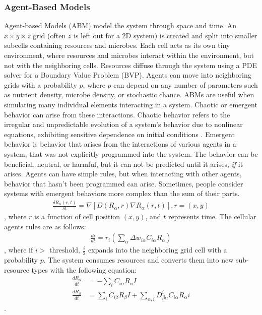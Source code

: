 \subsubsection{Agent-Based Models}
Agent-based Models (ABM) model the system through space and time.
An $x \times y \times z$ grid (often $z$ is left out for a 2D system) is created and split into smaller subcells containing resources and microbes.
Each cell acts as its own tiny environment, where resources and microbes interact within the environment, but not with the neighboring cells.
Resources diffuse through the system using a PDE solver for a Boundary Value Problem (BVP).
Agents can move into neighboring grids with a probability $p$, where $p$ can depend on any number of parameters such as nutrient density, microbe density, or stochastic chance. \newline 
ABMs are useful when simulating many individual elements interacting in a system.
Chaotic or emergent behavior can arise from these interactions.
Chaotic behavior refers to the irregular and unpredictable evolution of a system's behavior due to nonlinear equations, exhibiting sensitive dependence on initial conditions \cite{encyclopedia_of_physical_science_and_technology}. \newline 
Emergent behavior is behavior that arises from the interactions of various agents in a system, that was not explicitly programmed into the system.
The behavior can be beneficial, neutral, or harmful, but it can not be predicted until it arises, \textit{if} it arises.
Agents can have simple rules, but when interacting with other agents, behavior that hasn't been programmed can arise.
Sometimes, people consider systems with emergent behaviors more complex than the sum of their parts. \newline
\begin{align} 
    \frac{\delta R_\alpha(r, t)}{\delta t} = \nabla \left[D \left( R_\alpha, r\right) \nabla R_\alpha \left( r, t \right) \right], r = \left(x, y\right)
\end{align}, where $r$ is a function of cell position $(x, y)$, and $t$ represents time. 
The cellular agents rules are as follows: 
\begin{align} 
    \frac{di}{dt} = r_i \left( \sum_\alpha \Delta w_{i\alpha}C_{i\alpha}R_\alpha\right)
\end{align}, where if $i> \text{ threshold, }\frac{i}{2}$ expands into the neighboring grid cell with a probability $p$. 
The system consumes resources and converts them into new sub-resource types with the following equation:
\begin{align}    
    \frac{dR_\alpha}{dt} &= -\sum_i C_{i\alpha}R_\alpha I \\
    \frac{dR_\beta}{dt} &= \sum_i C_{i\beta}R_\beta I + \sum_{\alpha, i}D_{\beta \alpha}^{i} C_{i \alpha} R_\alpha i
\end{align}. 

